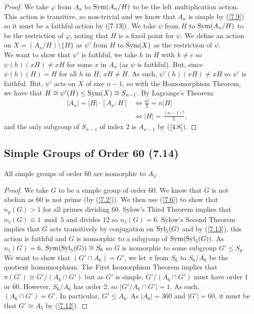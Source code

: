 \begin{proof}
    We take $\varphi$ from $A_n$ to $\operatorname{Sym}(A_n / H)$ to be the left
    multiplication action. This action is transitive, so non-trivial
    and we know that $A_n$ is simple by (\ref{7.9}) so it must be
    a faithful action by $(\ref{7.13})$. We take $\psi$ from
    $H$ to $\operatorname{Sym}(A_n / H)$ to be the restriction of $\varphi$, noting
    that $H$ is a fixed point for $\psi$. We define an action
    on $X = (A_n / H) \setminus \{H\}$ as $\psi'$ from $H$ to
    $\operatorname{Sym}(X)$ as the restriction of $\psi$.
    \\[\baselineskip]
    We want to show that $\psi'$ is faithful, we take $h$ in $H$
    with $h \neq e$ so $\psi(h)(xH) \neq xH$ for some $x$ in
    $A_n$ (as $\psi$ is faithful). But, since $\psi(h)(H) = H$
    for all $h$ in $H$, $xH \neq H$. As such, $\psi'(h)(xH) \neq xH$
    so $\psi'$ is faithful. But, $\psi'$ acts on $X$ of size $n - 1$,
    so with the Homomorphism Theorem, we have that 
    $H \cong \psi'(H)  \leq \operatorname{Sym}(X) \cong S_{n - 1}$. By Lagrange's 
    Theorem: \begin{align*}
        |A_n| = |H| \cdot [A_n : H]
        & \Longleftrightarrow
        \frac{n!}{2} = n|H| \\
        & \Longleftrightarrow
        |H| = \frac{(n - 1)!}{2},
    \end{align*} and the only subgroup of $S_{n - 1}$ of index 2 is
    $A_{n - 1}$ by ($\ref{4.8}$).
\end{proof}

\subsection{Simple Groups of Order 60 (7.14)} \label{7.14}

All simple groups of order 60 are isomorphic to $A_5$.

\begin{proof}
    We take $G$ to be a simple group of order 60. We know that 
    $G$ is not abelian as 60 is not prime (by (\ref{7.2})). 
    We then use (\ref{7.6}) to show that $n_p(G) > 1$ for all primes 
    dividing 60. Sylow's Third Theorem implies that 
    $n_5(G) \equiv 1 \bmod 5$ and divides $12$ so $n_5(G) = 6$. 
    Sylow's Second Theorem implies that $G$ acts transitively by 
    conjugation on $\operatorname{Syl}_5(G)$ and by (\ref{7.13}), this action is faithful and $G$ is isomorphic
    to a subgroup of $\operatorname{Sym}(\operatorname{Syl}_5(G))$. As $n_5(G) = 6$,
    $\operatorname{Sym}(\operatorname{Syl}_5(G)) \cong S_6$ so $G$ is isomorphic to some
    subgroup $G' \leq S_6$.
    \\[\baselineskip]
    We want to show that $(G' \cap A_6) = G'$, we let $\pi$ from
    $S_6$ to $S_6 / A_6$ be the quotient homomorphism. The First
    Isomorphism Theorem implies that $\pi(G') \cong G'/(A_6 \cap G')$
    but as $G'$ is simple, $G' / (A_6 \cap G')$ must have order 1 or
    60. However, $S_6 / A_6$ has order 2, so $|G' / A_6 \cap G'| = 1$.
    As such, $(A_6 \cap G') = G'$. In particular, $G' \leq A_6$.
    As $|A_6| = 360$ and $|G'| = 60$, it must be that 
    $G' \cong A_5$ by (\ref{7.12}).
\end{proof}

